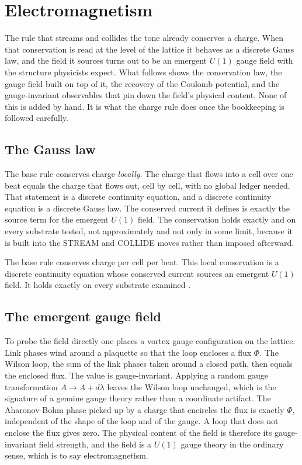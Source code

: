 \section{Electromagnetism}

The rule that streams and collides the tone already conserves a charge. When that conservation is read at the level of the lattice it behaves as a discrete Gauss law, and the field it sources turns out to be an emergent $U(1)$ gauge field with the structure physicists expect. What follows shows the conservation law, the gauge field built on top of it, the recovery of the Coulomb potential, and the gauge-invariant observables that pin down the field's physical content. None of this is added by hand. It is what the charge rule does once the bookkeeping is followed carefully.

\subsection{The Gauss law}

The base rule conserves charge \emph{locally}. The charge that flows into a cell over one beat equals the charge that flows out, cell by cell, with no global ledger needed. That statement is a discrete continuity equation, and a discrete continuity equation is a discrete Gauss law. The conserved current it defines is exactly the source term for the emergent $U(1)$ field. The conservation holds exactly and on every substrate tested, not approximately and not only in some limit, because it is built into the STREAM and COLLIDE moves rather than imposed afterward.

\begin{result}
The base rule conserves charge per cell per beat. This local conservation is a discrete continuity equation whose conserved current sources an emergent $U(1)$ field. It holds exactly on every substrate examined \cite{pollard2026vibetest}.
\end{result}

\subsection{The emergent gauge field}

To probe the field directly one places a vortex gauge configuration on the lattice. Link phases wind around a plaquette so that the loop encloses a flux $\Phi$. The Wilson loop, the sum of the link phases taken around a closed path, then equals the enclosed flux. The value is gauge-invariant. Applying a random gauge transformation $A \to A + d\lambda$ leaves the Wilson loop unchanged, which is the signature of a genuine gauge theory rather than a coordinate artifact. The Aharonov-Bohm phase picked up by a charge that encircles the flux is exactly $\Phi$, independent of the shape of the loop and of the gauge. A loop that does not enclose the flux gives zero. The physical content of the field is therefore its gauge-invariant field strength, and the field is a $U(1)$ gauge theory in the ordinary sense, which is to say electromagnetism.


